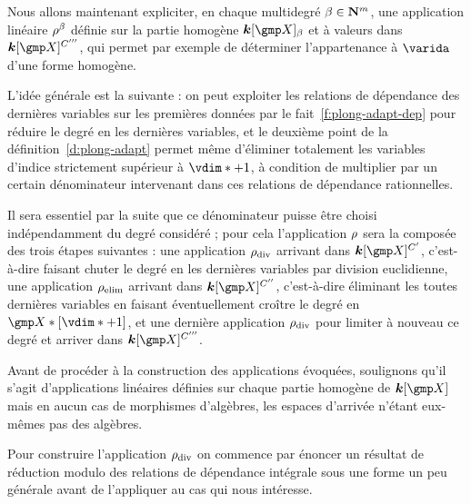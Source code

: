 Nous allons maintenant expliciter, en chaque multidegré \( \beta \in {\mathbf{N}}^m
\), une application linéaire \( \rho^\beta \) définie sur la partie homogène
\( \cdn[ \vmp ]_\beta \) et à valeurs dans \( \cdn[ \vmp ]^{C'''} \), qui
permet par exemple de déterminer l'appartenance à \( \varida \) d'une forme
homogène.

L'idée générale est la suivante : on peut exploiter les relations de
dépendance des dernières variables sur les premières données par le
fait~\vref{f:plong-adapt-dep} pour réduire le degré en les dernières
variables, et le deuxième point de la définition~\vref{d:plong-adapt} permet
même d'éliminer totalement les variables d'indice strictement supérieur à \(
  \vdim* + 1 \), à condition de multiplier par un certain dénominateur
intervenant dans ces relations de dépendance rationnelles.

Il sera essentiel par la suite que ce dénominateur puisse être choisi
indépendamment du degré considéré ; pour cela l'application \( \rho \)
sera la composée des trois étapes suivantes : une application \( \rho\sb{\mathrm{div }} \)
arrivant dans \( \cdn[ \vmp ]^{C'} \), c'est-à-dire faisant chuter le degré en
les dernières variables par division euclidienne, une application \( \rho\sb{\mathrm{elim}} \)
arrivant dans \( \cdn[ \vmp ]^{C''} \), c'est-à-dire éliminant
les toutes dernières variables en faisant éventuellement croître le degré en
\( \vmp*[\vdim*+1] \), et une dernière application \( \rho\sb{\mathrm{div }} \) pour limiter à
nouveau ce degré et arriver dans \( \cdn[ \vmp ]^{C'''} \).

Avant de procéder à la construction des applications évoquées, soulignons
qu'il s'agit d'applications linéaires définies sur chaque partie homogène de
\( \cdn[ \vmp ] \) mais en aucun cas de morphismes d'algèbres, les espaces
d'arrivée n'étant eux-mêmes pas des algèbres.

Pour construire l'application \( \rho\sb{\mathrm{div }} \) on commence par énoncer un résultat
de réduction modulo des relations de dépendance intégrale sous une forme un
peu générale avant de l'appliquer au cas qui nous intéresse.

